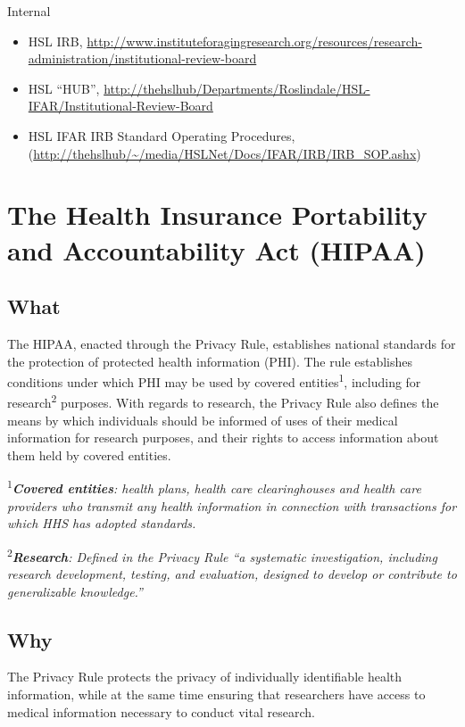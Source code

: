 \documentclass[]{book}
\providecommand{\tightlist}{%
  \setlength{\itemsep}{0pt}\setlength{\parskip}{0pt}}
\theoremstyle{definition}
\theoremstyle{definition}
\theoremstyle{definition}
\theoremstyle{remark}
\begin{document}
Internal

\begin{itemize}
\tightlist
\item
  HSL IRB,
  \url{http://www.instituteforagingresearch.org/resources/research-administration/institutional-review-board}
\item
  HSL ``HUB'',
  \url{http://thehslhub/Departments/Roslindale/HSL-IFAR/Institutional-Review-Board}
\item
  HSL IFAR IRB Standard Operating Procedures,
  (\url{http://thehslhub/~/media/HSLNet/Docs/IFAR/IRB/IRB_SOP.ashx})
\end{itemize}

\section{The Health Insurance Portability and Accountability Act
(HIPAA)}\label{the-health-insurance-portability-and-accountability-act-hipaa}

\subsection{What}\label{what-6}

The HIPAA, enacted through the Privacy Rule, establishes national
standards for the protection of protected health information (PHI). The
rule establishes conditions under which PHI may be used by covered
entities\textsuperscript{1}, including for research\textsuperscript{2}
purposes. With regards to research, the Privacy Rule also defines the
means by which individuals should be informed of uses of their medical
information for research purposes, and their rights to access
information about them held by covered entities.

\textsuperscript{1}\emph{\textbf{Covered entities}: health plans, health
care clearinghouses and health care providers who transmit any health
information in connection with transactions for which HHS has adopted
standards.}

\textsuperscript{2}\emph{\textbf{Research}: Defined in the Privacy Rule
``a systematic investigation, including research development, testing,
and evaluation, designed to develop or contribute to generalizable
knowledge.'' }

\subsection{Why}\label{why-6}

The Privacy Rule protects the privacy of individually identifiable
health information, while at the same time ensuring that researchers
have access to medical information necessary to conduct vital research.
\end{document}
